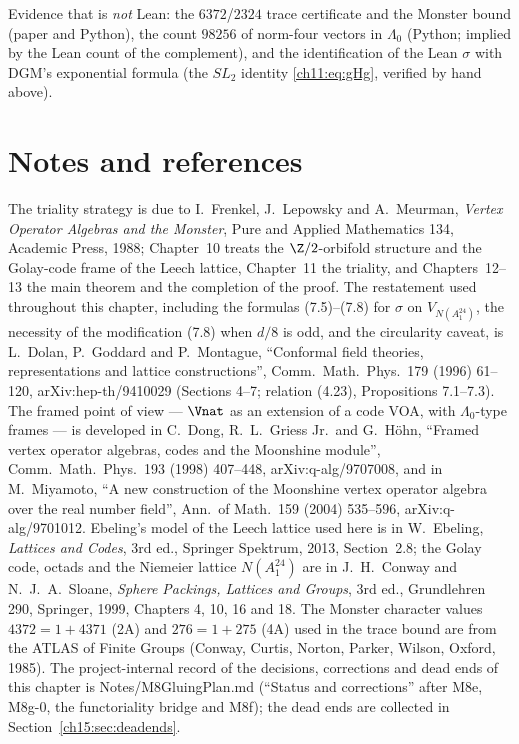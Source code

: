 Evidence that is \emph{not} Lean: the $6372$/$2324$ trace certificate and the Monster bound (paper and
Python), the count $98256$ of norm-four vectors in $\Lambda_0$ (Python; implied by the Lean count of the
complement), and the identification of the Lean $\sigma$ with DGM's exponential formula (the $SL_2$
identity \eqref{ch11:eq:gHg}, verified by hand above).

\section*{Notes and references}\label{ch11:sec:notes}

The triality strategy is due to I.~Frenkel, J.~Lepowsky and A.~Meurman, \emph{Vertex Operator Algebras
and the Monster}, Pure and Applied Mathematics 134, Academic Press, 1988; Chapter~10 treats the
$\Z/2$-orbifold structure and the Golay-code frame of the Leech lattice, Chapter~11 the triality, and
Chapters~12--13 the main theorem and the completion of the proof.  The restatement used throughout this
chapter, including the formulas (7.5)--(7.8) for $\sigma$ on $V_{N(A_1^{24})}$, the necessity of the
modification (7.8) when $d/8$ is odd, and the circularity caveat, is L.~Dolan, P.~Goddard and
P.~Montague, ``Conformal field theories, representations and lattice constructions'', Comm.\ Math.\
Phys.\ 179 (1996) 61--120, arXiv:hep-th/9410029 (Sections 4--7; relation (4.23), Propositions 7.1--7.3).
The framed point of view --- $\Vnat$ as an extension of a code VOA, with $\Lambda_0$-type frames --- is
developed in C.~Dong, R.~L.~Griess Jr.\ and G.~H\"ohn, ``Framed vertex operator algebras, codes and the
Moonshine module'', Comm.\ Math.\ Phys.\ 193 (1998) 407--448, arXiv:q-alg/9707008, and in M.~Miyamoto,
``A new construction of the Moonshine vertex operator algebra over the real number field'', Ann.\ of
Math.\ 159 (2004) 535--596, arXiv:q-alg/9701012.  Ebeling's model of the Leech lattice used here is in
W.~Ebeling, \emph{Lattices and Codes}, 3rd ed., Springer Spektrum, 2013, Section~2.8; the Golay code,
octads and the Niemeier lattice $N(A_1^{24})$ are in J.~H.~Conway and N.~J.~A.~Sloane, \emph{Sphere
Packings, Lattices and Groups}, 3rd ed., Grundlehren 290, Springer, 1999, Chapters 4, 10, 16 and 18.
The Monster character values $4372=1+4371$ (2A) and $276=1+275$ (4A) used in the trace bound are from the
ATLAS of Finite Groups (Conway, Curtis, Norton, Parker, Wilson, Oxford, 1985).  The project-internal
record of the decisions, corrections and dead ends of this chapter is Notes/M8GluingPlan.md (``Status
and corrections'' after M8e, M8g-0, the functoriality bridge and M8f); the dead ends are collected in
Section~\ref{ch15:sec:deadends}.
